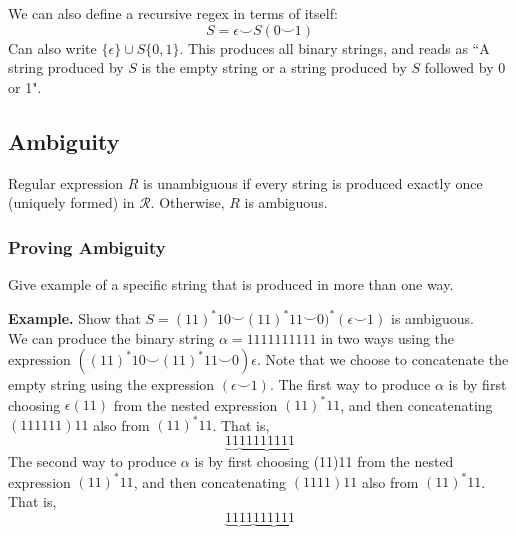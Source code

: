 \documentclass[11pt]{article}
\newenvironment{eg}[1]{
\begin{tcolorbox}[colback = white!15, arc=0pt,outer arc=0pt, colframe = black]
{\color{black} \textbf{Example.} #1} \\[5pt]
}
{
\end{tcolorbox}
}
\newcommand{\nl}{\\[5pt]}
\begin{document}
We can also define a recursive regex in terms of itself: $$S = \epsilon \smile S(0 \smile 1)$$
Can also write $\{\epsilon\} \cup S\{0, 1\}$. This produces all binary strings, and reads as ``A string produced by $S$ is the empty string or a string produced by $S$ followed by 0 or 1".

\subsection{Ambiguity}
Regular expression $R$ is unambiguous if every string is produced exactly once (uniquely formed) in $\mathcal{R}$. Otherwise, $R$ is ambiguous.

\subsubsection{Proving Ambiguity}
Give example of a specific string that is produced in more than one way.

\begin{eg}{Show that $S = (11)^*10 \smile (11)^*11 \smile 0)^*(\epsilon \smile 1)$ is ambiguous.}
We can produce the binary string $\alpha = 1111111111$ in two ways using the expression $((11)^* 10 \smile (11)^{*} 11 \smile 0) \epsilon$. Note that we choose to concatenate the empty string using the expression $(\epsilon \smile 1)$. The first way to produce $\alpha$ is by first choosing $\epsilon(11)$ from the nested expression $(11)^{*} 11$, and then concatenating $(111111)11$ also from $(11)^{*} 11$. That is, $$\underbrace{11}\underbrace{11111111}$$ 
The second way to produce $\alpha$ is by first choosing (11)11 from the nested expression $(11)^{*} 11$, and then concatenating $(1111)11$ also from $(11)^{*} 11$. That is, $$\underbrace{1111}\underbrace{111111}$$
\end{eg}
\end{document}
